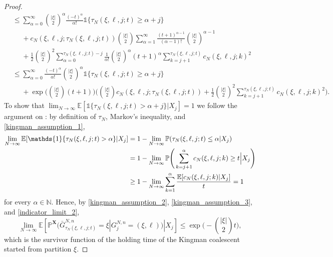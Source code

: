\documentclass[a4paper,11pt]{article}
\theoremstyle{definition}
\newcommand{\bbP}{\mathbb{P}}
\newcommand{\bbN}{\mathbb{N}}
\newcommand{\bbE}{\mathbb{E}}
\newcommand{\bfX}{\mathbf{X}}
\begin{document}
\begin{proof}
\begin{align*}
&\leq \sum_{ \alpha = 0 }^{ \infty } \binom{ | \xi | }{ 2 }^{ \alpha } \frac{ ( -t )^{ \alpha } }{ \alpha ! } \mathds{ 1 }\{ \tau_N( \xi, \ell, j; t ) \geq \alpha + j \} \\
&\phantom{\leq} +  c_N( \xi, \ell, j; \tau_N( \xi, \ell, j; t ) ) \binom{ | \xi | }{ 2 } \sum_{ \alpha = 1 }^{ \infty } \frac{ ( t + 1 )^{ \alpha - 1 } }{ ( \alpha - 1 ) ! } \binom{ | \xi | }{ 2 }^{ \alpha - 1 } \\
&\phantom{\leq} + \frac{ 1 }{ 2 } \binom{ | \xi | }{ 2 }^2 \sum_{ \alpha = 0 }^{ \tau_N( \xi, \ell, j; t ) - j } \frac{ 1 }{ \alpha ! } \binom{ | \xi | }{ 2 }^{ \alpha } ( t + 1 )^{ \alpha } \sum_{ k = j + 1 }^{ \tau_N( \xi, \ell, j; t ) } c_N( \xi, \ell, j; k )^2 \\
&\leq \sum_{ \alpha = 0 }^{ \infty } \frac{ ( -t )^{ \alpha } }{ \alpha ! } \binom{ | \xi | }{ 2 }^{ \alpha } \mathds{ 1 }\{ \tau_N( \xi, \ell, j; t ) \geq \alpha + j \} \\
&\phantom{\leq} + \exp\Bigg( \binom{ | \xi | }{ 2 } ( t + 1 ) \Bigg)  \Bigg(  \binom{ | \xi | }{ 2 } c_N( \xi, \ell, j; \tau_N( \xi, \ell, j; t ) ) + \frac{ 1 }{ 2 }  \binom{ | \xi | }{ 2 }^2 \sum_{ k = j + 1 }^{ \tau_N( \xi, \ell, j; t ) } c_N( \xi, \ell, j; k )^2 \Bigg).
\end{align*}
To show that $\lim_{ N \to \infty } \bbE[ \mathds{ 1 }\{ \tau_N( \xi, \ell, j; t ) > \alpha + j \} | X_j ] = 1$ we follow the argument on \cite[Page 572]{koskela2020annals}: by definition of $\tau_N$, Markov's inequality, and \eqref{kingman_assumption_1},
\begin{align}
\lim_{ N \to \infty } \bbE[ \mathds{ 1 }\{ \tau_N( \xi, \ell, j; t ) > \alpha \} | X_j ]&= 1 - \lim_{ N \to \infty } \bbP( \tau_N( \xi, \ell, j; t ) \leq \alpha | X_j ) \notag \\
&= 1 - \lim_{ N \to \infty } \bbP\Bigg( \sum_{ k = j + 1 }^{ \alpha } c_N( \xi, \ell, j; k ) \geq t \Big| X_j \Bigg) \notag \\
&\geq 1 - \lim_{ N \to \infty } \sum_{ k = 1 }^{ \alpha } \frac{ \bbE[ c_N( \xi, \ell, j; k ) | X_j ] }{ t } = 1 \label{indicator_limit_2}
\end{align}
for every $\alpha \in \bbN$.
Hence, by \eqref{kingman_assumption_2}, \eqref{kingman_assumption_3}, and \eqref{indicator_limit_2},
\begin{equation} \label{exponential_upper}
\lim_{ N \to \infty } \bbE[ \bbP^{ \bfX }( \bar{ G }_{ \tau_N( \xi, \ell, j; t ) }^{ N, n } = \xi | G_j^{ N, n } = ( \xi, \ell ) ) | X_j ] \leq \exp\Bigg( - \binom{ | \xi | }{ 2 } t \Bigg),
\end{equation}
which is the survivor function of the holding time of the Kingman coalescent started from partition $\xi$.


\end{proof}
\end{document}
